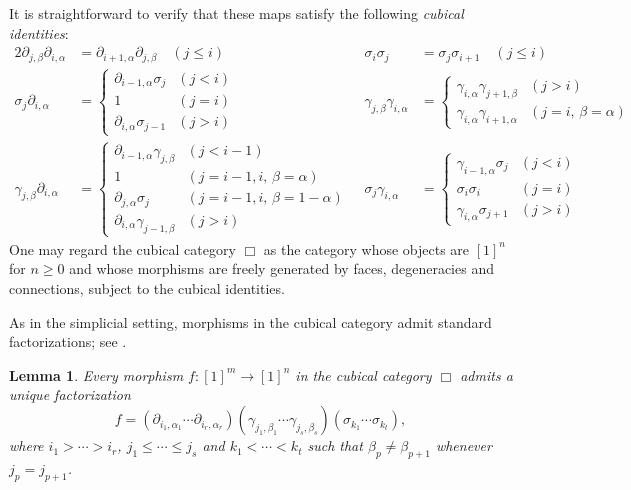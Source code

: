 \documentclass[oneside, 12pt]{amsart}
\numberwithin{equation}{section}
\theoremstyle{plain}
\newtheorem{lemma}[theorem]{Lemma}
\theoremstyle{definition}
\theoremstyle{remark}
\begin{document}
	\noindent It is straightforward to verify that these maps satisfy the following \emph{cubical identities}:
	\begin{alignat*}{2}
		\partial_{j,\beta}\partial_{i,\alpha}&=\partial_{i+1,\alpha}\partial_{j,\beta}\quad(j\le i)&\sigma_i\sigma_j&=\sigma_j\sigma_{i+1}\quad(j\le i)\\
		\sigma_j\partial_{i,\alpha}&=
		\begin{cases}
			\partial_{i-1,\alpha}\sigma_j&(j<i)\\
			1&(j=i)\\
			\partial_{i,\alpha}\sigma_{j-1}&(j>i)
		\end{cases}&
		\gamma_{j,\beta}\gamma_{i,\alpha}&=
		\begin{cases}
			\gamma_{i,\alpha}\gamma_{j+1,\beta}&(j>i)\\
			\gamma_{i,\alpha}\gamma_{i+1,\alpha}&(j=i,\,\beta=\alpha)
		\end{cases}\\
		\gamma_{j,\beta}\partial_{i,\alpha}&=
		\begin{cases}
			\partial_{i-1,\alpha}\gamma_{j,\beta}&(j<i-1)\\
			1&(j=i-1,i,\,\beta=\alpha)\\
			\partial_{j,\alpha}\sigma_j&(j=i-1,i,\,\beta=1-\alpha)\\
			\partial_{i,\alpha}\gamma_{j-1,\beta}&(j>i)
		\end{cases}\;&
		\sigma_j\gamma_{i,\alpha}&=
		\begin{cases}
			\gamma_{i-1,\alpha}\sigma_j&(j<i)\\
			\sigma_i\sigma_i&(j=i)\\
			\gamma_{i,\alpha}\sigma_{j+1}&(j>i)
		\end{cases}
	\end{alignat*}
	One may regard the cubical category $\Box$ as the category whose objects are $[1]^n$ for $n\ge 0$ and whose morphisms are freely generated by faces, degeneracies and connections, subject to the cubical identities.
	
	
	
	As in the simplicial setting, morphisms in the cubical category admit standard factorizations; see \cite[Theorem 5.1]{GM1}.
	
	
	
	\begin{lemma}
		\label{factorization}
		Every morphism $f\colon[1]^m\to[1]^n$ in the cubical category $\Box$ admits a unique factorization
		\[
		f=(\partial_{i_1,\alpha_1}\cdots\partial_{i_r,\alpha_r})(\gamma_{j_1,\beta_1}\cdots\gamma_{j_s,\beta_s})(\sigma_{k_1}\cdots\sigma_{k_t}),
		\]
		where $i_1>\cdots>i_r$, $j_1\le\cdots\le j_s$ and $k_1<\cdots<k_t$ such that $\beta_p\ne\beta_{p+1}$ whenever $j_p=j_{p+1}$.
	\end{lemma}
	
\end{document}
